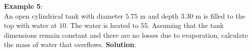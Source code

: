 \documentclass[10pt]{amsart}
\begin{document}
\begin{minipage}[c]{0.45\textwidth}
 \raggedright
 \textbf{Example 5}:\\
 An open cylindrical tank with diameter $5.75$ m and depth $3.30$ m is filled to the top with water at $10$\textcelsius.
 The water is heated to $55$\textcelsius. Assuming that the tank dimensions remain constant and there are no losses due to evaporation, calculate the mass of water that overflows.
 \parb
 \textbf{Solution}:
\end{minipage}
\newpage

\end{document}
